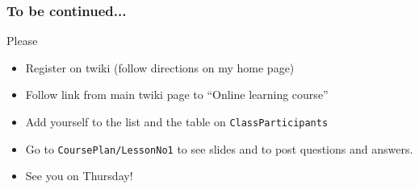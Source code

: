 \documentclass{beamer}
\begin{document}
\begin{frame}
\frametitle{To be continued...}
Please
\begin{itemize}
\item Register on twiki (follow directions on my home page)
\item Follow link from main twiki page to ``Online learning course''
\item Add yourself to the list and the table on {\tt ClassParticipants}
\item Go to {\tt CoursePlan/LessonNo1} to see slides and to post questions and answers.
\item See you on Thursday!
\end{itemize}
\end{frame}
\end{document}
